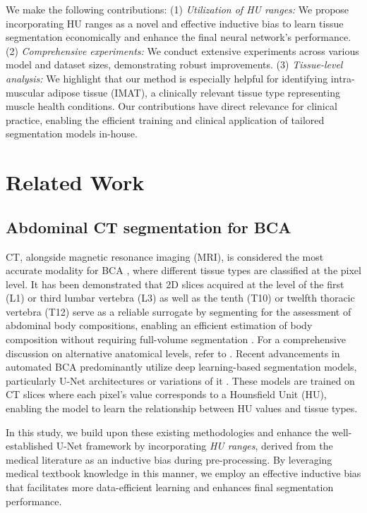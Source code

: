 \documentclass[conference]{IEEEtran}
\begin{document}
We make the following contributions: (1) \emph{Utilization of HU ranges:} We propose incorporating HU ranges as a novel and effective inductive bias to learn tissue segmentation economically and enhance the final neural network's performance. (2) \emph{Comprehensive experiments:} We conduct extensive experiments across various model and dataset sizes, demonstrating robust improvements. (3) \emph{Tissue-level analysis:} We highlight that our method is especially helpful for identifying intra-muscular adipose tissue (IMAT), a clinically relevant tissue type representing muscle health conditions.
Our contributions have direct relevance for clinical practice, enabling the efficient training and clinical application of tailored segmentation models in-house.

\section{Related Work} \label{sec:related-work}

\subsection{Abdominal CT segmentation for BCA}
CT, alongside magnetic resonance imaging (MRI), is considered the most accurate modality for BCA \cite{beaudart_sarcopenia_2016}, where different tissue types are classified at the pixel level.
It has been demonstrated that 2D slices acquired at the level of the first (L1)  \cite{tolonen_methodology_2021} or third lumbar vertebra (L3) \cite{amini_approaches_2019} as well as the tenth (T10) \cite{derstine2018skeletal} or twelfth thoracic vertebra (T12) \cite{cho2019association} serve as a reliable surrogate by segmenting for the assessment of abdominal body compositions, enabling an efficient estimation of body composition without requiring full-volume segmentation \cite{shen_total_2004}.
For a comprehensive discussion on alternative anatomical levels, refer to \cite{tolonen_methodology_2021}.
Recent advancements in automated BCA predominantly utilize deep learning-based segmentation models, particularly U-Net architectures \cite{paris_automated_2020, hemke_deep_2020, koitka_fully_2021} or variations of it \cite{dabiri_muscle_2019}.
These models are trained on CT slices where each pixel's value corresponds to a Hounsfield Unit (HU), enabling the model to learn the relationship between HU values and tissue types.

In this study, we build upon these existing methodologies and enhance the well-established U-Net framework \cite{navab_u-net_2015} by incorporating \emph{HU ranges}, derived from the medical literature as an inductive bias during pre-processing. By leveraging medical textbook knowledge in this manner, we employ an effective inductive bias that facilitates more data-efficient learning and enhances final segmentation performance.
\end{document}

